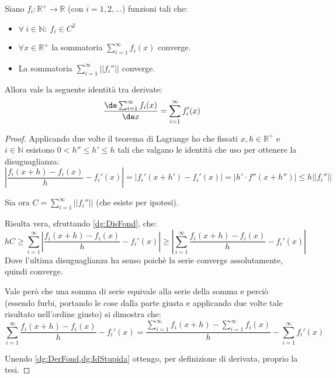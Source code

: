 \begin{lemma}\label{dg:SommaDer}
	Siano $f_i:\mathbb{R^+}\to\mathbb R$ (con $i=1,2,\dots$) funzioni tali che:
	\begin{itemize}
		\item $\forall\ i\in\mathbb{N} :\ f_i\in C^2$
		\item $\forall x\in \mathbb{R^+}$ la sommatoria $\sum_{i=1}^{\infty}f_i(x)$ converge.
		\item La sommatoria $\sum_{i=1}^{\infty} ||f_i''||$ converge.
	\end{itemize}
	
	Allora vale la seguente identità tra derivate:
	\begin{equation*}
		\frac{\de \sum_{i=1}^{\infty}f_i(x)}{\de x}=\sum_{i=1}^{\infty}f_i'(x)
	\end{equation*}
\end{lemma}
\begin{proof}
	Applicando due volte il teorema di Lagrange ho che fissati $x,h\in\mathbb{R^+}$ e $i\in\mathbb{N}$
	esistono $0<h''\le h'\le h$ tali che valgano le identità che uso per ottenere la disuguaglianza:
	\begin{equation}\label{dg:DisFond}
		\left\lvert\frac{f_i(x+h)-f_i(x)}h - f_i'(x)\right\rvert=\left\lvert f_i'(x+h') - f_i'(x)\right\rvert
		=\left\lvert h'\cdot f''(x+h'') \right\rvert\le h||f_i''||
	\end{equation}
	
	Sia ora $C=\sum_{i=1}^{\infty} ||f_i''||$ (che esiste per ipotesi).
	
	Risulta vera, sfruttando \cref{dg:DisFond}, che:
	\begin{equation}\label{dg:DerFond}
		hC\ge \sum_{i=1}^{\infty}\left\lvert\frac{f_i(x+h)-f_i(x)}h - f_i'(x)\right\rvert \ge
		\left\lvert\sum_{i=1}^{\infty}\frac{f_i(x+h)-f_i(x)}h - f_i'(x)\right\rvert
	\end{equation}
	Dove l'ultima disuguaglianza ha senso poichè la serie converge assolutamente, quindi converge.
	
	Vale però che una somma di serie equivale alla serie della somma e perciò
	(essendo furbi, portando le cose dalla parte giusta e applicando due volte tale risultato nell'ordine giusto)
	si dimostra che:
	\begin{equation}\label{dg:IdStupida}
		\sum_{i=1}^{\infty}\frac{f_i(x+h)-f_i(x)}h - f_i'(x)=
		\frac{\sum_{i=1}^{\infty} f_i(x+h)- \sum_{i=1}^{\infty}f_i(x)}h -\sum_{i=1}^{\infty}f_i'(x)
	\end{equation}

	Unendo \cref{dg:DerFond,dg:IdStupida} ottengo, per definizione di derivata, proprio la tesi.
\end{proof}

